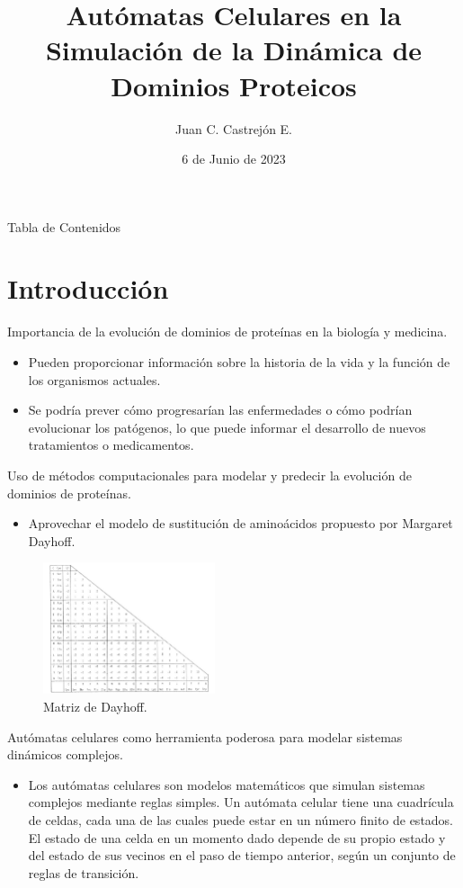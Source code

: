 \documentclass{beamer}
\title[A.C. en la Simulación de la Dinámica de Dominios Proteicos]{Autómatas Celulares en la Simulación de la Dinámica de Dominios Proteicos}
\author[Universidad Nacional Autónoma de México]{Juan C. Castrejón E.}
\institute{Universidad Nacional Autónoma de México}
\date{6 de Junio de 2023}
\begin{document}
\begin{frame}
\titlepage
\end{frame}

\begin{frame}{Tabla de Contenidos}
\tableofcontents
\end{frame}

\section{Introducción}

\begin{frame}{Importancia de la evolución de dominios de proteínas en la biología y medicina.}
\begin{itemize}
    \item Pueden proporcionar información sobre la historia de la vida y la función de los organismos actuales.
    \item Se podría prever cómo progresarían las enfermedades o cómo podrían evolucionar los patógenos, lo que puede informar el desarrollo de nuevos tratamientos o medicamentos.
\end{itemize}
\end{frame}

\begin{frame}{Uso de métodos computacionales para modelar y predecir la evolución de dominios de proteínas.}
\begin{itemize}
    \item Aprovechar el modelo de sustitución de aminoácidos propuesto por Margaret Dayhoff.
\end{itemize}
\begin{figure}[ht]
\includegraphics[width=0.45\textwidth]{assets/dayhoff.jpg}
\caption{Matriz de Dayhoff.}
\label{fig:dayhoff.svg}
\end{figure}
\end{frame}

\begin{frame}{Autómatas celulares como herramienta poderosa para modelar sistemas dinámicos complejos.}
\begin{itemize}
    \item Los autómatas celulares son modelos matemáticos que simulan sistemas complejos mediante reglas simples. Un autómata celular tiene una cuadrícula de celdas, cada una de las cuales puede estar en un número finito de estados. El estado de una celda en un momento dado depende de su propio estado y del estado de sus vecinos en el paso de tiempo anterior, según un conjunto de reglas de transición.
\end{itemize}
\end{frame}
\end{document}
